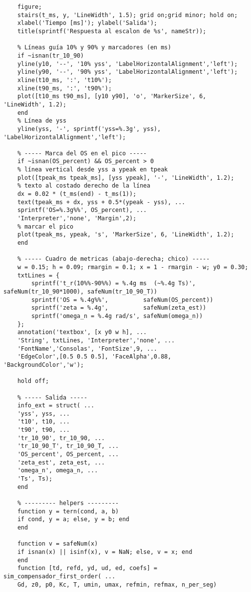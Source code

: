 \begin{lstlisting}[style=matlabstyle,caption={Funciones desarrolladas para la práctica.},label={matlab:func}]
	% ----- Grafico -----
	figure;
	stairs(t_ms, y, 'LineWidth', 1.5); grid on;grid minor; hold on;
	xlabel('Tiempo [ms]'); ylabel('Salida');
	title(sprintf('Respuesta al escalon de %s', nameStr));
	
	% Líneas guía 10% y 90% y marcadores (en ms)
	if ~isnan(tr_10_90)
	yline(y10, '--', '10% yss', 'LabelHorizontalAlignment','left');
	yline(y90, '--', '90% yss', 'LabelHorizontalAlignment','left');
	xline(t10_ms, ':', 't10%');
	xline(t90_ms, ':', 't90%');
	plot([t10_ms t90_ms], [y10 y90], 'o', 'MarkerSize', 6, 'LineWidth', 1.2);
	end
	% Línea de yss
	yline(yss, '-', sprintf('yss=%.3g', yss), 'LabelHorizontalAlignment','left');
	
	% ----- Marca del OS en el pico -----
	if ~isnan(OS_percent) && OS_percent > 0
	% línea vertical desde yss a ypeak en tpeak
	plot([tpeak_ms tpeak_ms], [yss ypeak], '-', 'LineWidth', 1.2);
	% texto al costado derecho de la línea
	dx = 0.02 * (t_ms(end) - t_ms(1));
	text(tpeak_ms + dx, yss + 0.5*(ypeak - yss), ...
	sprintf('OS=%.3g%%', OS_percent), ...
	'Interpreter','none', 'Margin',2);
	% marcar el pico
	plot(tpeak_ms, ypeak, 's', 'MarkerSize', 6, 'LineWidth', 1.2);
	end
	
	% ----- Cuadro de metricas (abajo-derecha; chico) -----
	w = 0.15; h = 0.09; rmargin = 0.1; x = 1 - rmargin - w; y0 = 0.30;
	txtLines = {
		sprintf('t_r(10%%-90%%) = %.4g ms  (~%.4g Ts)', safeNum(tr_10_90*1000), safeNum(tr_10_90_T))
		sprintf('OS = %.4g%%',          safeNum(OS_percent))
		sprintf('zeta = %.4g',          safeNum(zeta_est))
		sprintf('omega_n = %.4g rad/s', safeNum(omega_n))
	};
	annotation('textbox', [x y0 w h], ...
	'String', txtLines, 'Interpreter','none', ...
	'FontName','Consolas', 'FontSize',9, ...
	'EdgeColor',[0.5 0.5 0.5], 'FaceAlpha',0.88, 'BackgroundColor','w');
	
	hold off;
	
	% ----- Salida -----
	info_ext = struct( ...
	'yss', yss, ...
	't10', t10, ...
	't90', t90, ...
	'tr_10_90', tr_10_90, ...
	'tr_10_90_T', tr_10_90_T, ...
	'OS_percent', OS_percent, ...
	'zeta_est', zeta_est, ...
	'omega_n', omega_n, ...
	'Ts', Ts);
	end
	
	% --------- helpers ---------
	function y = tern(cond, a, b)
	if cond, y = a; else, y = b; end
	end
	
	function v = safeNum(x)
	if isnan(x) || isinf(x), v = NaN; else, v = x; end
	end
	function [td, refd, yd, ud, ed, coefs] = sim_compensador_first_order( ...
	Gd, z0, p0, Kc, T, umin, umax, refmin, refmax, n_per_seg)
	

\end{lstlisting}
